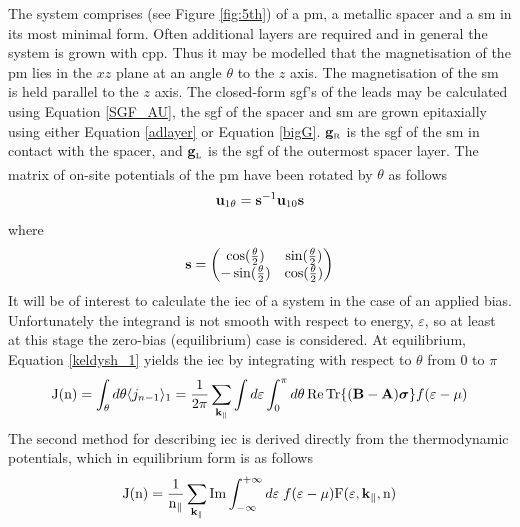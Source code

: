 \documentclass[a4paper, 12pt]{article}
\begin{document}
\par The system comprises (see Figure \ref{fig:5th}) of a \gls{pm}, a metallic spacer and a \gls{sm} in its most minimal form. Often additional layers are required and in general the system is grown with \gls{cpp}. Thus it may be modelled that the magnetisation of the \gls{pm} lies in the $xz$ plane at an angle $\theta$ to the $z$ axis. The magnetisation of the \gls{sm} is held parallel to the $z$ axis. The closed-form \gls{sgf}'s of the leads may be calculated using Equation \eqref{SGF_AU}, the \gls{sgf} of the spacer and \gls{sm} are grown epitaxially using either Equation \eqref{adlayer} or Equation \eqref{bigG}. $\bf g_{\rm\scriptscriptstyle R}$ is the \gls{sgf} of the \gls{sm} in contact with the spacer, and $\bf g_{\rm\scriptscriptstyle L}$ is the \gls{sgf} of the outermost spacer layer.
The matrix of on-site potentials of the \gls{pm} have been rotated by $\theta$ as follows\textcolor{blue}{\textsuperscript{\cite{SC}}}
\begin{equation}
	\rm\bf u_{\rm 1 \theta}\; {\rm =}\; s^{\rm -1}u_{\rm 1 0}s
\end{equation}
where 
\begin{equation}
	{\bf s} = \begin{pmatrix} \cos(\frac{\theta}{2})&\sin(\frac{\theta}{2})\\-\sin(\frac{\theta}{2})&\cos(\frac{\theta}{2}) \end{pmatrix}
\end{equation}
It will be of interest to calculate the \gls{iec} of a system in the case of an applied bias. Unfortunately the integrand is not smooth with respect to energy, $\varepsilon$, so at least at this stage the zero-bias (equilibrium) case is considered.
At equilibrium, Equation \eqref{keldysh_1} yields the \gls{iec} by integrating with respect to $\theta$ from $0$ to $	\pi$
\begin{equation}\label{alt_exchange}
	{\rm J(n)}= \int_\theta d\theta \langle j_{n-1}\rangle_1 = \frac{1}{2\pi}\sum_{\bf k_\parallel}\int d\varepsilon \int_0^\pi d\theta\,\rm Re \, Tr \lbrace \bf (B-A)\bm\sigma\rbrace \mathnormal f(\varepsilon - \mu)
\end{equation}
The second method for describing \gls{iec} is derived directly from the thermodynamic potentials, which in equilibrium form is as follows
\begin{equation}\label{exchange}
	\rm J(n) = \frac{1}{n_\parallel}\sum_{\bf k_\parallel}Im\int_{-\infty}^{+\infty}{\mathnormal d}\varepsilon\;{\mathnormal f}(\varepsilon - \mu)F(\varepsilon, {\bf k_\parallel}, n)
\end{equation}
\end{document}
